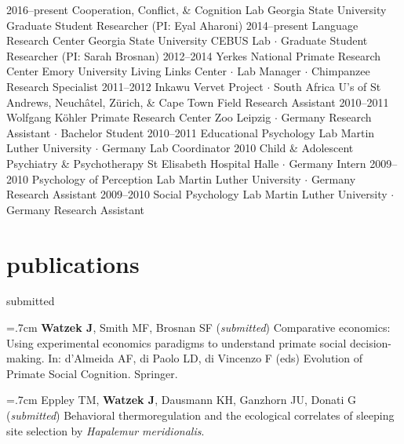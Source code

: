 \documentclass[]{friggeri-cv}
\begin{document}
\begin{entrylist}
  \entry
    {2016--present}
    {Cooperation, Conflict, \& Cognition Lab}
    {Georgia State University}
    {Graduate Student Researcher (PI: Eyal Aharoni)}
  \entry
    {2014--present}
    {Language Research Center}
    {Georgia State University}
    {CEBUS Lab $\cdot$ Graduate Student Researcher (PI: Sarah Brosnan)}
  \entry
    {2012--2014}
    {Yerkes National Primate Research Center}
    {Emory University}
    {Living Links Center $\cdot$ Lab Manager $\cdot$ Chimpanzee Research Specialist}
  \entry
    {2011--2012}
    {Inkawu Vervet Project $\cdot$ South Africa}
    {U's of St Andrews, Neuch\^{a}tel, Z\"urich, \& Cape Town}
    {Field Research Assistant}
  \entry
    {2010--2011}
    {Wolfgang K\"{o}hler Primate Research Center}
    {Zoo Leipzig $\cdot$ Germany}
    {Research Assistant $\cdot$ Bachelor Student}
  \entry
    {2010--2011}
    {Educational Psychology Lab}
    {Martin Luther University $\cdot$ Germany}
    {Lab Coordinator}
  \entry
    {2010}
    {Child \& Adolescent Psychiatry \& Psychotherapy}
    {St Elisabeth Hospital Halle $\cdot$ Germany}
    {Intern}
  \entry
    {2009--2010}
    {Psychology of Perception Lab}
    {Martin Luther University $\cdot$ Germany}
    {Research Assistant}
  \entry
    {2009--2010}
    {Social Psychology Lab}
    {Martin Luther University $\cdot$ Germany}
    {Research Assistant}
\end{entrylist}


\newpage
\thispagestyle{fancy}

\section{publications}

{\large{} submitted}

\hangindent=.7cm \textbf{Watzek J}, Smith MF, Brosnan SF (\emph{submitted}) Comparative economics: Using experimental economics paradigms to understand primate social decision-making. In: d'Almeida AF, di Paolo LD, di Vincenzo F (eds) Evolution of Primate Social Cognition. Springer.

\hangindent=.7cm Eppley TM, \textbf{Watzek J}, Dausmann KH, Ganzhorn JU, Donati G (\emph{submitted}) Behavioral thermoregulation and the ecological correlates of sleeping site selection by \emph{Hapalemur meridionalis}.\\[-.1cm]
\end{document}

